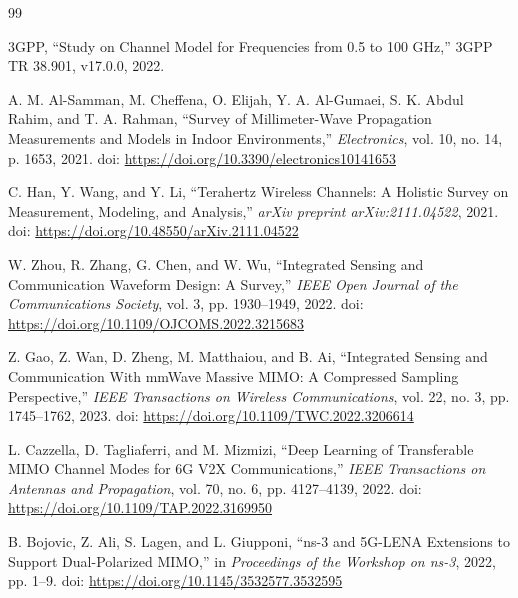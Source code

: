 

\begin{thebibliography}{99}

    3GPP, ``Study on Channel Model for Frequencies from 0.5 to 100 GHz,''
    3GPP TR 38.901, v17.0.0, 2022.

    A. M. Al-Samman, M. Cheffena, O. Elijah, Y. A. Al-Gumaei, S. K. Abdul Rahim, and T. A. Rahman,
    ``Survey of Millimeter-Wave Propagation Measurements and Models in Indoor Environments,''
    \emph{Electronics}, vol. 10, no. 14, p. 1653, 2021.
    doi: \url{https://doi.org/10.3390/electronics10141653}

    C. Han, Y. Wang, and Y. Li,
    ``Terahertz Wireless Channels: A Holistic Survey on Measurement, Modeling, and Analysis,''
    \emph{arXiv preprint arXiv:2111.04522}, 2021.
    doi: \url{https://doi.org/10.48550/arXiv.2111.04522}

    W. Zhou, R. Zhang, G. Chen, and W. Wu,
    ``Integrated Sensing and Communication Waveform Design: A Survey,''
    \emph{IEEE Open Journal of the Communications Society}, vol. 3, pp. 1930--1949, 2022.
    doi: \url{https://doi.org/10.1109/OJCOMS.2022.3215683}

    Z. Gao, Z. Wan, D. Zheng, M. Matthaiou, and B. Ai,
    ``Integrated Sensing and Communication With mmWave Massive MIMO: A Compressed Sampling Perspective,''
    \emph{IEEE Transactions on Wireless Communications}, vol. 22, no. 3, pp. 1745--1762, 2023.
    doi: \url{https://doi.org/10.1109/TWC.2022.3206614}

    L. Cazzella, D. Tagliaferri, and M. Mizmizi,
    ``Deep Learning of Transferable MIMO Channel Modes for 6G V2X Communications,''
    \emph{IEEE Transactions on Antennas and Propagation}, vol. 70, no. 6, pp. 4127--4139, 2022.
    doi: \url{https://doi.org/10.1109/TAP.2022.3169950}

    B. Bojovic, Z. Ali, S. Lagen, and L. Giupponi,
    ``ns-3 and 5G-LENA Extensions to Support Dual-Polarized MIMO,''
    in \emph{Proceedings of the Workshop on ns-3}, 2022, pp. 1--9.
    doi: \url{https://doi.org/10.1145/3532577.3532595}


\end{thebibliography}

